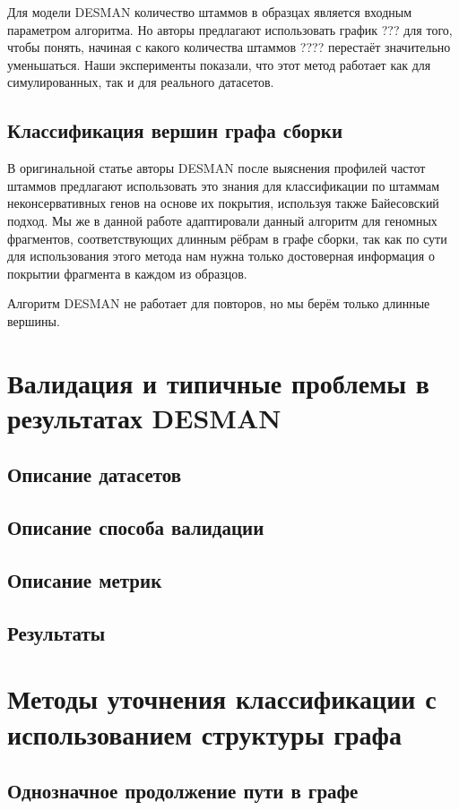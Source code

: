 \documentclass{spbau-diploma}
\begin{document}
Для модели DESMAN количество штаммов в образцах является входным параметром алгоритма. Но авторы предлагают использовать график ??? для того, чтобы понять, начиная с какого количества штаммов ???? перестаёт значительно уменьшаться. Наши эксперименты показали, что этот метод работает как для симулированных, так и для реального датасетов.

\subsection{Классификация вершин графа сборки}

В оригинальной статье авторы DESMAN после выяснения профилей частот штаммов предлагают использовать это знания для классификации по штаммам неконсервативных генов на основе их покрытия, используя также Байесовский подход. Мы же в данной работе адаптировали данный алгоритм для геномных фрагментов, соответствующих длинным рёбрам в графе сборки, так как по сути для использования этого метода нам нужна только достоверная информация о покрытии фрагмента в каждом из образцов.

Алгоритм DESMAN не работает для повторов, но мы берём только длинные вершины.




\section{Валидация и типичные проблемы в результатах DESMAN}
\subsection{Описание датасетов}
\subsection{Описание способа валидации}
\subsection{Описание метрик}
\subsection{Результаты}


\section{Методы уточнения классификации с использованием структуры графа}
\subsection{Однозначное продолжение пути в графе}
\end{document}

